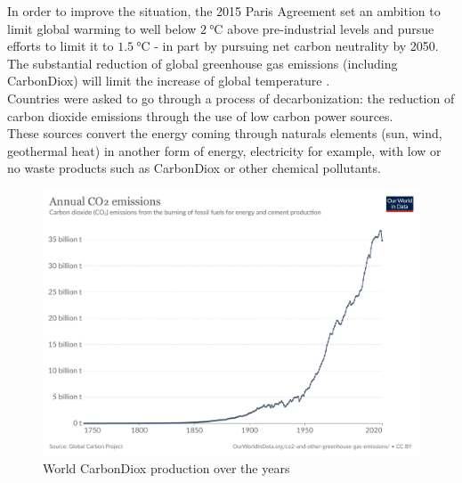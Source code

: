 In order to improve the situation, the 2015 Paris Agreement set an ambition to limit global warming to well below $\SI{2}{\degreeCelsius}$ above pre-industrial levels and pursue efforts to limit it to $\SI{1.5}{\degreeCelsius}$ - in part by pursuing net carbon neutrality by 2050. The substantial reduction of global greenhouse gas emissions (including \gls{CarbonDiox})  will limit the increase of global temperature \cite{french_conference}. \\
Countries were asked to go through a process of decarbonization: the reduction of carbon dioxide emissions through the use of low carbon power sources. \\
These sources convert the energy coming through naturals elements (sun, wind, geothermal heat) in another form of energy, electricity for example, with low or no waste products such as \gls{CarbonDiox} or other chemical pollutants. 

\begin{figure}[H]
\centering
    \includegraphics[width=.6\linewidth]{images/Introduction/annual-co2-emissions-per-country.pdf}
\caption[\gls{CarbonDiox} production over the years]{World \gls{CarbonDiox} production over the years \cite{C02prod}}
\end{figure}


